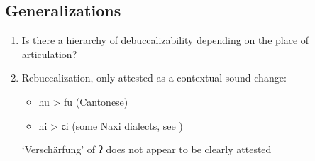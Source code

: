 \documentclass[oldfontcommands,oneside,a4paper,11pt]{article}
\begin{document}
 

 
  \subsection{Generalizations}
 \begin{enumerate}
\item Is there a hierarchy of debuccalizability depending on the place of articulation? %

\item  Rebuccalization, only attested as a contextual sound change:
 \begin{itemize}
\item hu > fu (Cantonese)
\item hi > ɕi (some Naxi dialects, see \citealt{michaud06neutralisation})
 \end{itemize}
`Verschärfung' of ʔ does not appear to be clearly attested
 \end{enumerate}


\end{document}
